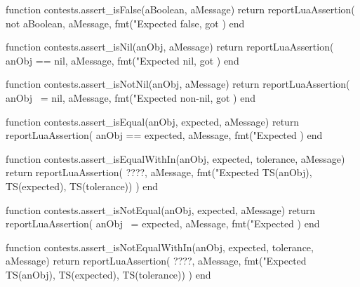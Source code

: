 \stopTestCase
\stopTestSuite


\startLuaCode
function contests.assert_isFalse(aBoolean, aMessage)
  return reportLuaAssertion(
    not aBoolean,
    aMessage,
    fmt("Expected false, got %
  )
end
\stopLuaCode

\stopTestSuite


\startLuaCode
function contests.assert_isNil(anObj, aMessage)
  return reportLuaAssertion(
    anObj == nil,
    aMessage,
    fmt("Expected nil, got %
  )
end
\stopLuaCode

\stopTestSuite


\startLuaCode
function contests.assert_isNotNil(anObj, aMessage)
  return reportLuaAssertion(
    anObj ~= nil,
    aMessage,
    fmt("Expected non-nil, got %
  )
end
\stopLuaCode

\stopTestSuite


\startLuaCode
function contests.assert_isEqual(anObj, expected, aMessage)
  return reportLuaAssertion(
    anObj == expected,
    aMessage,
    fmt("Expected %
  )
end
\stopLuaCode

\stopTestSuite


\startLuaCode
function contests.assert_isEqualWithIn(anObj, expected, tolerance, aMessage)
  return reportLuaAssertion(
    ????,
    aMessage,
    fmt("Expected %
      TS(anObj), TS(expected), TS(tolerance))
  )
end
\stopLuaCode

\stopTestSuite


\startLuaCode
function contests.assert_isNotEqual(anObj, expected, aMessage)
  return reportLuaAssertion(
    anObj ~= expected,
    aMessage,
    fmt("Expected %
  )
end
\stopLuaCode

\stopTestSuite

\startLuaCode
function contests.assert_isNotEqualWithIn(anObj, expected, tolerance, aMessage)
  return reportLuaAssertion(
    ????,
    aMessage,
    fmt("Expected %
      TS(anObj), TS(expected), TS(tolerance))
  )
end
\stopLuaCode

